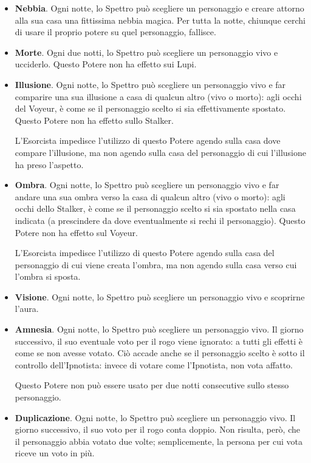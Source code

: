 \documentclass[a4paper,10pt]{article}
\begin{document}
\begin{itemize}
 \item {\bf Nebbia}. Ogni notte, lo Spettro può scegliere un personaggio e creare attorno alla sua casa una fittissima nebbia magica. Per tutta la notte, chiunque cerchi di usare il proprio potere su quel personaggio, fallisce.
 
 \item {\bf Morte}. Ogni due notti, lo Spettro può scegliere un personaggio vivo e ucciderlo. Questo Potere non ha effetto sui Lupi.
 
 \item {\bf Illusione}. Ogni notte, lo Spettro può scegliere un personaggio vivo e far comparire una sua illusione a casa di qualcun altro (vivo o morto): agli occhi del Voyeur, è come se il personaggio scelto si sia effettivamente spostato.
 Questo Potere non ha effetto sullo Stalker.
 
 L'Esorcista impedisce l'utilizzo di questo Potere agendo sulla casa dove compare l'illusione, ma non agendo sulla casa del personaggio di cui l'illusione ha preso l'aspetto.

 \item {\bf Ombra}. Ogni notte, lo Spettro può scegliere un personaggio vivo e far andare una sua ombra verso la casa di qualcun altro (vivo o morto): agli occhi dello Stalker, è come se il personaggio scelto si sia spostato nella casa indicata (a prescindere da dove eventualmente si rechi il personaggio).
 Questo Potere non ha effetto sul Voyeur.
 
 L'Esorcista impedisce l'utilizzo di questo Potere agendo sulla casa del personaggio di cui viene creata l'ombra, ma non agendo sulla casa verso cui l'ombra si sposta.
 
 \item {\bf Visione}. Ogni notte, lo Spettro può scegliere un personaggio vivo e scoprirne l'aura.
 
 \item {\bf Amnesia}. Ogni notte, lo Spettro può scegliere un personaggio vivo. Il giorno successivo, il suo eventuale voto per il rogo viene ignorato: a tutti gli effetti è come se non avesse votato. Ciò accade anche se il personaggio scelto è sotto il controllo dell'Ipnotista: invece di votare come l'Ipnotista, non vota affatto.
 
 Questo Potere non può essere usato per due notti consecutive sullo stesso personaggio.
 
 \item {\bf Duplicazione}. Ogni notte, lo Spettro può scegliere un personaggio vivo. Il giorno successivo, il suo voto per il rogo conta doppio. Non risulta, però, che il personaggio abbia votato due volte; semplicemente, la persona per cui vota riceve un voto in più.
 

\end{itemize}
\end{document}
